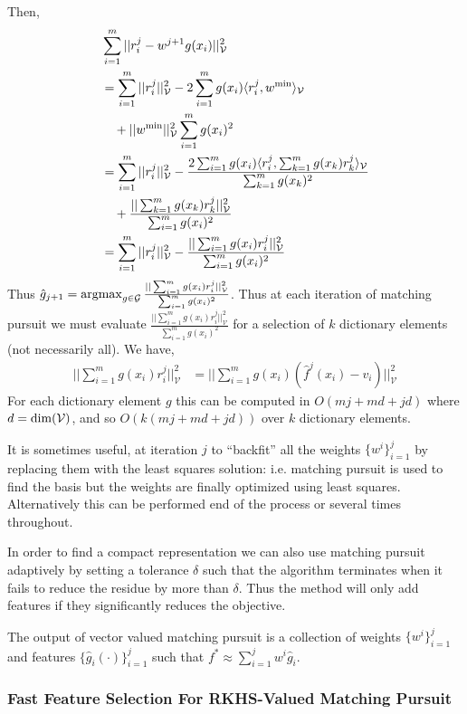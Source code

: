 \documentclass[letterpaper]{article}
\newcommand{\cV}{{\mathcal V}}
\newcommand{\cG}{{\mathcal G}}
\newcommand{\argmax}{\operatornamewithlimits{argmax}}
\newcommand{\lang}{\langle}
\newcommand{\rang}{\rangle}
\newcommand{\nn}{\nonumber}
\begin{document}
Then,
\begin{align}
&\sum_{i=1}^m ||r^j_i -  w^{j+1} g(x_i)  ||_{\cV}^2 \nn\\
&=  \sum_{i=1}^m ||r^j_i||_\cV^2 - 2\sum_{i=1}^m g(x_i)\lang  r^j_i,w^{\rm min} \rang_\cV \nn\\
&\quad + ||w^{\rm min}||_\cV^2 \sum_{i=1}^m  g(x_i)^2 \nn\\
&= \sum_{i=1}^m ||r^j_i||_\cV^2 - \frac{2\sum_{i=1}^m g(x_i)\lang  r^j_i, \sum_{k=1}^m  g(x_k)  r^j_k   \rang_\cV}{ \sum_{k=1}^m  g(x_k)^2} \\
&\quad + \frac{ ||\sum_{k=1}^m  g(x_k)  r^j_k  ||_\cV^2 }{ \sum_{i=1}^m  g(x_i)^2 }\nn\\
&= \sum_{i=1}^m ||r^j_i||_\cV^2 - \frac{ ||\sum_{i=1}^m  g(x_i)  r^j_i  ||_\cV^2 }{ \sum_{i=1}^m  g(x_i)^2 }\nn
\end{align}
Thus $\hat g_{j+1} = \argmax_{g\in\cG}  \frac{ ||\sum_{i=1}^m  g(x_i)  r^j_i  ||_\cV^2 }{ \sum_{i=1}^m  g(x_i)^2 }$. Thus at each iteration of matching pursuit we must evaluate $\frac{ ||\sum_{i=1}^m  g(x_i)  r^j_i  ||_\cV^2 }{ \sum_{i=1}^m  g(x_i)^2 }$ for a selection of $k$ dictionary elements (not necessarily all). We have,
\begin{align}
 ||\sum_{i=1}^m  g(x_i)  r^j_i  ||_\cV^2  &=  ||\sum_{i=1}^m  g(x_i) (\hat f^j(x_i) - v_i)  ||_\cV^2 \nn
\end{align}
For each dictionary element $g$ this can be computed in $O(mj+md+jd)$ where $d={\rm dim}(\cV)$, and so $O(k(mj+md+jd))$ over $k$ dictionary elements.

It is sometimes useful, at iteration $j$ to ``backfit'' all the weights $\{w^i\}_{i=1}^j$ by replacing them with the least squares solution: i.e. matching pursuit is used to find the basis but the weights are finally optimized using least squares. Alternatively this can be performed end of the process or several times throughout.

In order to find a compact representation we can also use matching pursuit adaptively by setting a tolerance $\delta$ such that the algorithm terminates when it fails to reduce the residue by more than $\delta$. Thus the method will only add features if they significantly reduces the objective.

The output of vector valued matching pursuit is a collection of weights $\{w^i\}_{i=1}^j$ and features $\{ \hat g_i(\cdot) \}_{i=1}^j$ such that $f^* \approx \sum_{i=1}^j w^i \hat g_i$. 


\subsubsection{Fast Feature Selection For RKHS-Valued Matching Pursuit}
\end{document}
